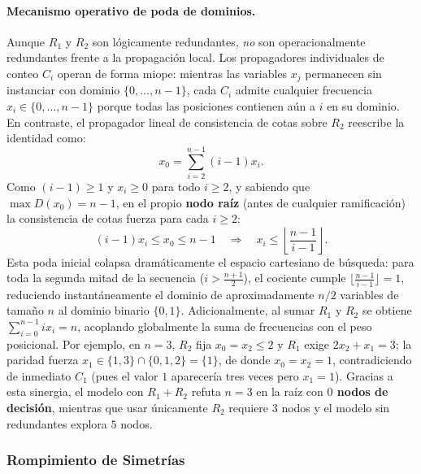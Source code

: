 \paragraph{Mecanismo operativo de poda de dominios.}
Aunque $R_1$ y $R_2$ son lógicamente redundantes, \emph{no} son operacionalmente redundantes frente a la propagación local. Los propagadores individuales de conteo $C_i$ operan de forma miope: mientras las variables $x_j$ permanecen sin instanciar con dominio $\{0, \dots, n-1\}$, cada $C_i$ admite cualquier frecuencia $x_i \in \{0, \dots, n-1\}$ porque todas las posiciones contienen aún a $i$ en su dominio. En contraste, el propagador lineal de consistencia de cotas sobre $R_2$ reescribe la identidad como:
\begin{equation}
    x_0 = \sum_{i=2}^{n-1} (i - 1) x_i.
    \label{eq:sm_cota_r2}
\end{equation}
Como $(i-1) \ge 1$ y $x_i \ge 0$ para todo $i \ge 2$, y sabiendo que $\max D(x_0) = n - 1$, en el propio \textbf{nodo raíz} (antes de cualquier ramificación) la consistencia de cotas fuerza para cada $i \ge 2$:
\[
    (i - 1) x_i \le x_0 \le n - 1 \quad \Longrightarrow \quad x_i \le \left\lfloor \frac{n - 1}{i - 1} \right\rfloor.
\]
Esta poda inicial colapsa dramáticamente el espacio cartesiano de búsqueda: para toda la segunda mitad de la secuencia ($i > \frac{n+1}{2}$), el cociente cumple $\lfloor \frac{n-1}{i-1} \rfloor = 1$, reduciendo instantáneamente el dominio de aproximadamente $n/2$ variables de tamaño $n$ al dominio binario $\{0, 1\}$. Adicionalmente, al sumar $R_1$ y $R_2$ se obtiene $\sum_{i=0}^{n-1} i x_i = n$, acoplando globalmente la suma de frecuencias con el peso posicional. Por ejemplo, en $n=3$, $R_2$ fija $x_0 = x_2 \le 2$ y $R_1$ exige $2x_2 + x_1 = 3$; la paridad fuerza $x_1 \in \{1, 3\} \cap \{0,1,2\} = \{1\}$, de donde $x_0 = x_2 = 1$, contradiciendo de inmediato $C_1$ (pues el valor $1$ aparecería tres veces pero $x_1 = 1$). Gracias a esta sinergia, el modelo con $R_1 + R_2$ refuta $n=3$ en la raíz con \textbf{$0$ nodos de decisión}, mientras que usar únicamente $R_2$ requiere $3$ nodos y el modelo sin redundantes explora $5$ nodos.

\subsubsection{Rompimiento de Simetrías}

